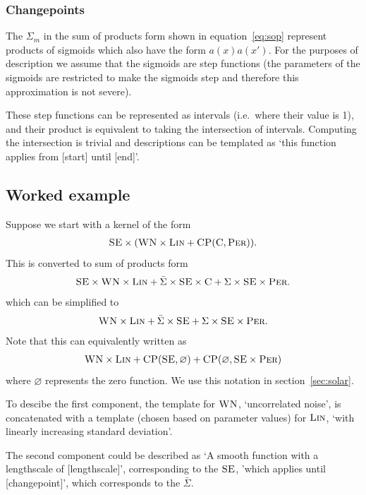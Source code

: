 \documentclass{article}
\def\ie{i.e.\ }
\let\emptyset\varnothing
\begin{document}
\subsubsection{Changepoints}

The $\Sigma_m$ in the sum of products form shown in equation~\eqref{eq:sop} represent products of sigmoids which also have the form $a(x)a(x')$.
For the purposes of description we assume that the sigmoids are step functions (the parameters of the sigmoids are restricted to make the sigmoids step and therefore this approximation is not severe).

These step functions can be represented as intervals (\ie where their value is 1), and their product is equivalent to taking the intersection of intervals.
Computing the intersection is trivial and descriptions can be templated as `this function applies from [start] until [end]'.

\subsection{Worked example}

Suppose we start with a kernel of the form
\begin{align*}
{\textsc{SE}} \times ({\textsc{WN}} \times {\textsc{Lin}} + {\textsc{CP}}({\textsc{C}}, {\textsc{Per}})).
\end{align*}
This is converted to sum of products form
\begin{align*}
{\textsc{SE}} \times {\textsc{WN}} \times {\textsc{Lin}} + \bar\Sigma\times{\textsc{SE}} \times {\textsc{C}} + \Sigma\times{\textsc{SE}} \times {\textsc{Per}}.
\end{align*}
which can be simplified to
\begin{align*}
{\textsc{WN}} \times {\textsc{Lin}} + \bar\Sigma\times{\textsc{SE}} + \Sigma\times{\textsc{SE}} \times {\textsc{Per}}.
\end{align*}
Note that this can equivalently written as
\begin{align*}
\kWN \times \kLin + \kCP(\kSE, \emptyset) + \kCP(\emptyset, \kSE \times \kPer)
\end{align*}
where $\emptyset$ represents the zero function.
We use this notation in section~\ref{sec:solar}.

To descibe the first component, the template for ${\textsc{WN}}$, `uncorrelated noise', is concatenated with a template (chosen based on parameter values) for ${\textsc{Lin}}$, `with linearly increasing standard deviation'.

The second component could be described as `A smooth function with a lengthscale of [lengthscale]', corresponding to the ${\textsc{SE}}$, 'which applies until [changepoint]', which corresponds to the $\bar\Sigma$.
\end{document}
